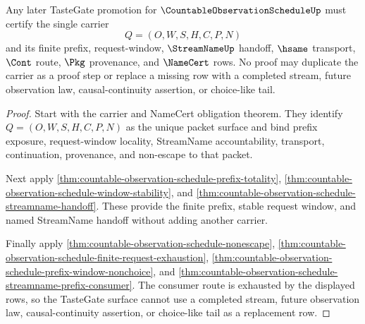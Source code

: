 \begin{theorem}
\label{thm:countable-observation-schedule-tastegate-surface}
Any later TasteGate promotion for $\CountableObservationScheduleUp$ must certify the single carrier
$$
Q=(O,W,S,H,C,P,N)
$$
and its finite prefix, request-window, $\StreamNameUp$ handoff, $\hsame$ transport, $\Cont$ route, $\Pkg$ provenance, and $\NameCert$ rows. No proof may duplicate the carrier as a proof step or replace a missing row with a completed stream, future observation law, causal-continuity assertion, or choice-like tail.
\end{theorem}
\begin{proof}
Start with the carrier and NameCert obligation theorem. They identify $Q=(O,W,S,H,C,P,N)$ as the unique packet surface and bind prefix exposure, request-window locality, StreamName accountability, transport, continuation, provenance, and non-escape to that packet.

Next apply \autoref{thm:countable-observation-schedule-prefix-totality}, \autoref{thm:countable-observation-schedule-window-stability}, and \autoref{thm:countable-observation-schedule-streamname-handoff}. These provide the finite prefix, stable request window, and named StreamName handoff without adding another carrier.

Finally apply \autoref{thm:countable-observation-schedule-nonescape}, \autoref{thm:countable-observation-schedule-finite-request-exhaustion}, \autoref{thm:countable-observation-schedule-prefix-window-nonchoice}, and \autoref{thm:countable-observation-schedule-streamname-prefix-consumer}. The consumer route is exhausted by the displayed rows, so the TasteGate surface cannot use a completed stream, future observation law, causal-continuity assertion, or choice-like tail as a replacement row.
\end{proof}

